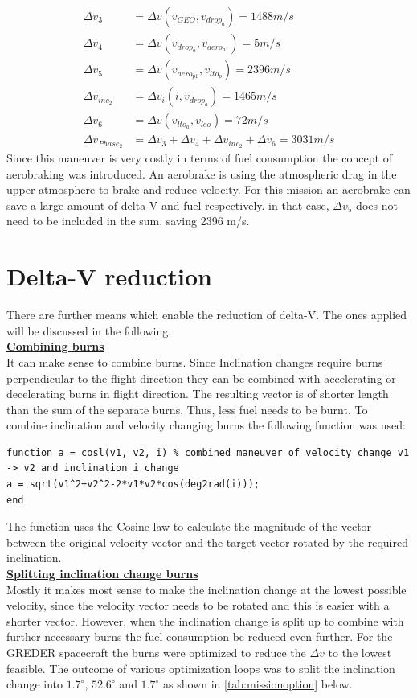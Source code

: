 \begin{align}
	\Delta v_3 &=\Delta v(v_{GEO}, v_{drop_a}) = 1488 m/s\\
	\Delta v_4 &=\Delta v(v_{drop_a}, v_{aero_{a1}}) = 5 m/s   \\
	\Delta v_5 &=\Delta v(v_{aero_{p1}}, v_{lto_p}) = 2396 m/s   \\
	\Delta v_{inc_2} &=\Delta v_i(i, v_{drop_a}) = 1465 m/s   \\
	\Delta v_6 &=\Delta v (v_{lto_a}, v_{leo}) = 72 m/s  \\
	\Delta v_{Phase_2} &= \Delta v_3 + \Delta v_4 + \Delta v_{inc_2} + \Delta v_6 =3031 m/s
\end{align}
Since this maneuver is very costly in terms of fuel consumption the concept of aerobraking was
introduced. An aerobrake is using the atmospheric drag in the upper atmosphere to brake and reduce
velocity. For this mission an aerobrake can save a large amount of delta-V and fuel respectively. in that case, $\Delta v_5$ does not need to be included in the sum, saving 2396 m/s.

\section{Delta-V reduction}
There are further means which enable the reduction of delta-V. The ones applied will be discussed in the
following.\\

\textbf{\underline{Combining burns}}\\
It can make sense to combine burns. Since Inclination changes require burns perpendicular to the flight
direction they can be combined with accelerating or decelerating burns in flight direction. The resulting vector is of shorter length than the sum of the separate burns. Thus, less fuel needs to be burnt. To combine inclination and velocity changing burns the following function was used:
\begin{verbatim}
function a = cosl(v1, v2, i) % combined maneuver of velocity change v1 -> v2 and inclination i change
a = sqrt(v1^2+v2^2-2*v1*v2*cos(deg2rad(i)));
end
\end{verbatim}

The function uses the Cosine-law to calculate the magnitude of the vector between the original velocity
vector and the target vector rotated by the required inclination.\\

\textbf{\underline{Splitting inclination change burns}}\\
Mostly it makes most sense to make the inclination change at the lowest possible velocity, since the
velocity vector needs to be rotated and this is easier with a shorter vector. However, when the inclination change is split up to combine with further necessary burns the fuel consumption be reduced even further. For the GREDER spacecraft the burns were optimized to reduce the $\Delta v$ to the lowest feasible. The outcome of various optimization loops was to split the inclination change into $1.7^\circ$, $52.6^\circ$ and $1.7^\circ$ as shown in \autoref{tab:missionoption} below.\\

